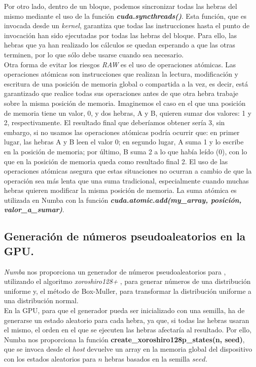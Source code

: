 Por otro lado, dentro de un bloque, podemos sincronizar todas las hebras del mismo mediante el uso de la función \textbf{\textit{cuda.syncthreads()}}. Esta función, que es invocada desde un \textit{kernel}, garantiza que todas las instrucciones hasta el punto de invocación han sido ejecutadas por todas las hebras del bloque. Para ello, las hebras que ya han realizado los cálculos se quedan esperando a que las otras terminen, por lo que sólo debe usarse cuando sea necesario.\\


Otra forma de evitar los riesgos \textit{RAW} es el uso de operaciones atómicas. Las operaciones atómicas son instrucciones que realizan la lectura, modificación y escritura de una posición de memoria global o compartida a la vez, es decir, está garantizado que realice todas sus operaciones antes de que otra hebra trabaje sobre la misma posición de memoria. Imaginemos el caso en el que una posición de memoria tiene un valor, 0, y dos hebras, A y B, quieren sumar dos valores: 1 y 2, respectivamente. El resultado final que deberíamos obtener sería 3, sin embargo, si no usamos las operaciones atómicas podría ocurrir que: en primer lugar, las hebras A y B leen el valor 0; en segundo lugar, A suma 1 y lo escribe en la posición de memoria; por último, B suma 2 a lo que había leído (0), con lo que en la posición de memoria queda como resultado final 2. El uso de las operaciones atómicas asegura que estas situaciones no ocurran a cambio de que la operación sea más lenta que una suma tradicional, especialmente cuando muchas hebras quieren modificar la misma posición de memoria. La suma atómica es utilizada en Numba con la función \textbf{\textit{cuda.atomic.add(my\_array, posición, valor\_a\_sumar)}}.


\subsection{Generación de números pseudoaleatorios en la GPU.}

\textit{Numba} nos proporciona un generador de números pseudoaleatorios para \cudanospace, utilizando el algoritmo \textit{xoroshiro128+} \cite{xoroshiro}, para generar números de una distribución uniforme y, el método de Box-Muller, para transformar la distribución uniforme a una distribución normal.\\

En la GPU, para que el generador pueda ser inicializado con una semilla, ha de generarse un estado aleatorio para cada hebra, ya que, si todas las hebras usaran el mismo, el orden en el que se ejecuten las hebras afectaría al resultado. Por ello, Numba nos proporciona la función \textbf{create\_xoroshiro128p\_states(n, seed)}, que se invoca desde el \textit{host} devuelve un array en la memoria global del dispositivo con los estados aleatorios para $n$ hebras basados en la semilla $seed$.\\

